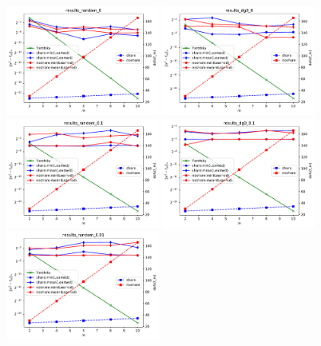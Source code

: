 \documentclass[onetab, a4paper]{siamart171218}
\theoremstyle{remark}
\begin{document}
\begin{figure}
  \begin{center}
  \includegraphics[width=0.45\textwidth]{./img/results_random_0}
  \includegraphics[width=0.45\textwidth]{./img/results_dg0_0}\\
  \includegraphics[width=0.45\textwidth]{./img/results_random_01}
  \includegraphics[width=0.45\textwidth]{./img/results_dg0_01}\\
  \includegraphics[width=0.45\textwidth]{./img/results_random_001}

\end{center}
\end{figure}
\end{document}
